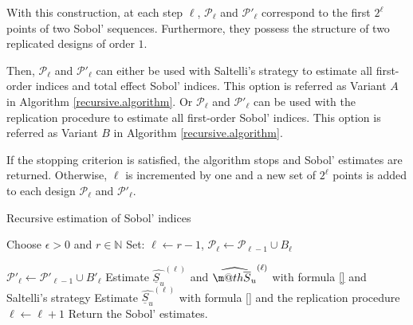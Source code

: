 \documentclass[]{elsarticle}
\makeatletter
\theoremstyle{definition}
\newcommand*{\ov}[1]{
  \m@th\overline{\mbox{#1}\raisebox{2mm}{}}
}
\def\abs#1{\ensuremath{\left \lvert #1 \right \rvert}}
\makeatother
\begin{document}
With this construction, at each step $\ell$, $\mathcal{P}_{\ell}$ and $\mathcal{P}'_{\ell}$ correspond to the first $2^\ell$ points of two Sobol' sequences. Furthermore, they possess the structure of two replicated designs of order $1$.
\bigskip

Then, $\mathcal{P}_{\ell}$ and $\mathcal{P}'_{\ell}$ can either be used with Saltelli's strategy to estimate all first-order indices and total effect Sobol' indices. This option is referred as Variant $A$ in Algorithm \ref{recursive.algorithm}. Or $\mathcal{P}_{\ell}$ and $\mathcal{P}'_{\ell}$ can be used with the replication procedure to estimate all first-order Sobol' indices. This option is referred as Variant $B$ in Algorithm \ref{recursive.algorithm}.

If the stopping criterion is satisfied, the algorithm stops and Sobol' estimates are returned. Otherwise, $\ell$ is incremented by one and a new set of $2^{\ell}$ points is added to each design $\mathcal{P}_{\ell}$ and $\mathcal{P}'_{\ell}$. 

\begin{algorithm}[!ht]
\caption{Recursive estimation of Sobol' indices}
\begin{algorithmic}[1]
\vspace*{0.2cm}
\State Choose $\epsilon >0$ and $r \in \mathbb{N}$
\State Set: $\ell \leftarrow r-1$, 
\While {$\abs{\varepsilon_{S_u}} \leq \epsilon$}
\State $\mathcal{P}_\ell \leftarrow \mathcal{P}_{\ell-1} \cup B_\ell$

\hspace*{-0.3cm} $\mathcal{P}'_\ell \leftarrow \mathcal{P}'_{\ell-1} \cup {B'}_\ell$
\State Estimate $\widehat{\underline{S}_u}^{(\ell)}$ and $\widehat{\ov{$S$}_u}^{(\ell)}$ with formula \ref{} and Saltelli's strategy
\EndIf
{}
\State Estimate $\widehat{\underline{S}_u}^{(\ell)}$ with formula \ref{} and the replication procedure
\EndIf
\EndFor
\State $\ell \leftarrow \ell + 1$
\EndWhile
\State Return the Sobol' estimates.
\end{algorithmic}
\label{recursive.algorithm}
\end{algorithm}
\end{document}
